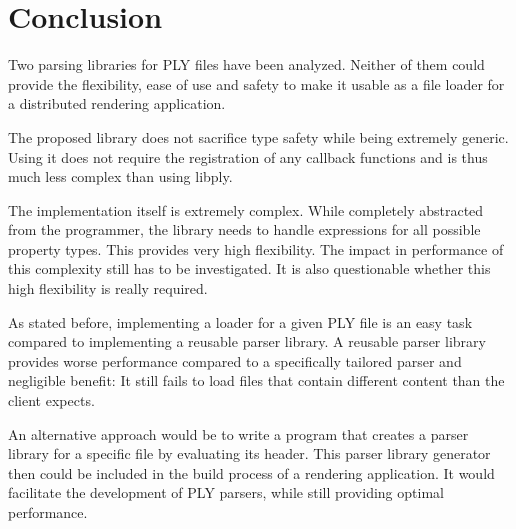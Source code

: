 \section{Conclusion}

Two parsing libraries for PLY files have been analyzed. Neither of them could
provide the flexibility, ease of use and safety to make it usable as a file
loader for a distributed rendering application.

The proposed library does not sacrifice type safety while being extremely
generic. Using it does not require the registration of any callback functions
and is thus much less complex  than using libply.

The implementation itself is extremely complex. While completely abstracted from
the programmer, the library needs to handle expressions for all possible
property types. This provides very high flexibility. The impact in performance
of this complexity still has to be investigated. It is also questionable whether
this high flexibility is really required.

As stated before, implementing a loader for a given PLY file is an easy task
compared to implementing a reusable parser library. A reusable parser library
provides worse performance compared to a specifically tailored parser and
negligible benefit: It still fails to load files that contain different content
than the client expects.

An alternative approach would be to write a program that creates a parser
library for a specific file by evaluating its header. This parser library
generator then could be included in the build process of a rendering
application. It would facilitate the development of PLY parsers, while still
providing optimal performance.

